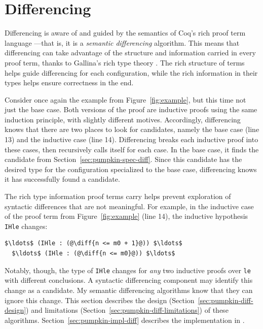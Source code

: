 \section{Differencing}
\label{sec:pumpkin-diff}



Differencing is aware of and guided by the semantics of Coq's rich proof term language ---that is, it is a \textit{semantic differencing} algorithm.
This means that differencing can take advantage of the structure and information carried in every proof term,
thanks to Gallina's rich type theory .
The rich structure of terms helps guide differencing for each configuration,
while the rich information in their types helps ensure correctness in the end.

Consider once again the example from Figure~\ref{fig:example}, but this time not just the base case.
Both versions of the proof are inductive proofs using the same induction principle, with slightly different motives.
Accordingly, differencing knows that there are two places to look for candidates, namely the base case (line 13)
and the inductive case (line 14).
Differencing breaks each inductive proof into these cases, then recursively calls itself for each case.
In the base case, it finds the candidate from Section~\ref{sec:pumpkin-spec-diff}.
Since this candidate has the desired type for the configuration specialized to the base case, differencing knows it has successfully found a candidate.

The rich type information proof terms carry helps prevent exploration of syntactic differences that are not meaningful.
For example, in the inductive case of the proof term from Figure~\ref{fig:example} (line 14), the inductive hypothesis \lstinline{IHle} changes:

\begin{lstlisting}[language=coq]
  $\ldots$ (IHle : (@\diff{n <= m0 + 1}@)) $\ldots$
  $\ldots$ (IHle : (@\diff{n <= m0}@)) $\ldots$
\end{lstlisting}
Notably, though, the type of \lstinline{IHle} changes for \emph{any} two inductive proofs over \lstinline{le}
with different conclusions. A syntactic differencing component 
may identify this change as a candidate.
My semantic differencing algorithms know that they can ignore this change.
This section describes the design (Section~\ref{sec:pumpkin-diff-design}) and limitations (Section~\ref{sec:pumpkin-diff-limitations}) of these algorithms.
Section~\ref{sec:pumpkin-impl-diff} describes the implementation in \sysname.

